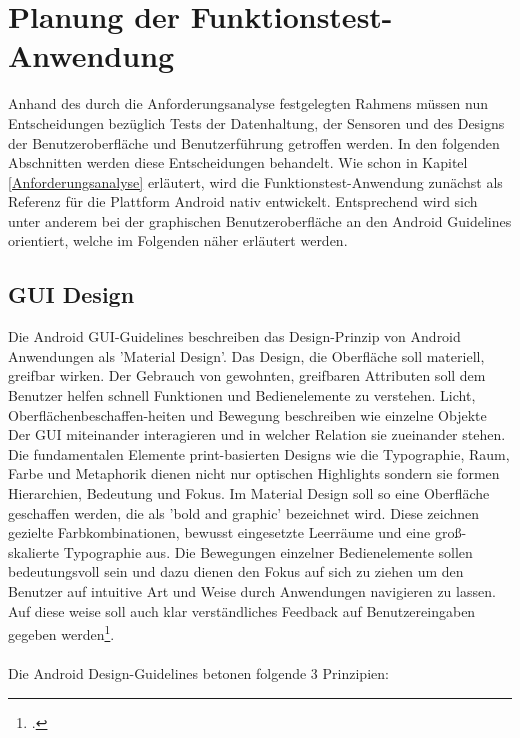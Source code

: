 \chapter{Planung der Funktionstest-Anwendung} \label{PlanungAnwendung}

Anhand des durch die Anforderungsanalyse festgelegten Rahmens müssen nun Entscheidungen bezüglich Tests der Datenhaltung, der Sensoren und des Designs der Benutzeroberfläche und Benutzerführung getroffen werden. In den folgenden Abschnitten werden diese Entscheidungen behandelt. Wie schon in Kapitel \ref{Anforderungsanalyse} erläutert, wird die Funktionstest-Anwendung zunächst als Referenz für die Plattform Android nativ entwickelt. Entsprechend wird sich unter anderem bei der graphischen Benutzeroberfläche an den Android Guidelines orientiert, welche im Folgenden näher erläutert werden. 

\section{GUI Design} \label{PlanungAnwGUI}

Die Android GUI-Guidelines beschreiben das Design-Prinzip von Android Anwendungen als 'Material Design'. Das Design, die Oberfläche soll materiell, greifbar wirken. Der Gebrauch von gewohnten, greifbaren Attributen soll dem Benutzer helfen schnell Funktionen und Bedienelemente zu verstehen. Licht, Oberflächenbeschaffen-heiten und Bewegung beschreiben wie einzelne Objekte Der GUI miteinander interagieren und in welcher Relation sie zueinander stehen. Die fundamentalen Elemente print-basierten Designs wie die Typographie, Raum, Farbe und Metaphorik dienen nicht nur optischen Highlights sondern sie formen Hierarchien, Bedeutung und Fokus. Im Material Design soll so eine Oberfläche geschaffen werden, die als 'bold and graphic' bezeichnet wird. Diese zeichnen gezielte Farbkombinationen, bewusst eingesetzte Leerräume und eine groß-skalierte Typographie aus. Die Bewegungen einzelner Bedienelemente sollen bedeutungsvoll sein und dazu dienen den Fokus auf sich zu ziehen um den Benutzer auf intuitive Art und Weise durch Anwendungen navigieren zu lassen. Auf diese weise soll auch klar verständliches Feedback auf Benutzereingaben gegeben werden\footcite{AndroidOnlineGuidelines}. 
\\
\\
Die Android Design-Guidelines betonen folgende 3 Prinzipien:

